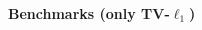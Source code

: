 \documentclass[french]{STIC_poster}
\begin{document}
\begin{frame}[t]
\begin{columns}[t]
\begin{column}{.48\linewidth}
\begin{nbox}[\textwidth]{\textbf{Benchmarks (only TV-$\ell_1$)}}
\begin{figure}
                            \end{figure}
				\end{nbox}
			\end{column}
			\hfill
		\end{columns}
	\end{frame}

 
\end{document}
